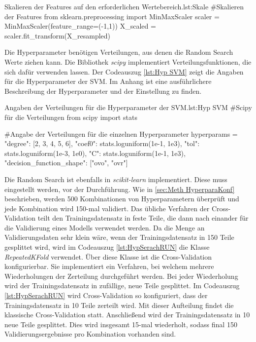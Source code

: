 \begin{pythoncode}{Skalieren der Features auf den erforderlichen Wertebereich.}{lst:Skale}
#Skalieren der Features 
from sklearn.preprocessing import MinMaxScaler
scaler = MinMaxScaler(feature_range=(-1,1))
X_scaled = scaler.fit_transform(X_resampled)
\end{pythoncode}

Die Hyperparameter benötigen Verteilungen, aus denen die Random Search Werte ziehen kann. Die Bibliothek \textit{scipy} implementiert Verteilungsfunktionen, die sich dafür verwenden lassen. Der Codeauszug \ref{lst:Hyp SVM} zeigt die Angaben für die Hyperparameter der SVM. Im Anhang ist eine ausführlichere Beschreibung der Hyperparameter und der Einstellung zu finden.

\begin{pythoncode}{Angaben der Verteilungen für die Hyperparameter der SVM.}{lst:Hyp SVM}
#Scipy für die Verteilungen
from scipy import stats

#Angabe der Verteilungen für die einzelnen Hyperparameter
hyperparams =  {"degree": [2, 3, 4, 5, 6],
                "coef0": stats.loguniform(1e-1, 1e3),
                "tol": stats.loguniform(1e-3, 1e0),
                "C": stats.loguniform(1e-1, 1e3),
                "decision_function_shape": ["ovo", "ovr"]}
\end{pythoncode}

Die Random Search ist ebenfalls in \textit{scikit-learn} implementiert. Diese muss eingestellt werden, vor der Durchführung. Wie in \autoref{sec:Meth HyperparaKonf} beschrieben, werden 500 Kombinationen von Hyperparametern überprüft und jede Kombination wird 150-mal validiert. Das übliche Verfahren der Cross-Validation teilt den Trainingsdatensatz in feste Teile, die dann nach einander für die Validierung eines Modells verwendet werden. Da die Menge an Validierungsdaten sehr klein wäre, wenn der Trainingsdatensatz in 150 Teile gesplittet wird, wird im Codeauszug \ref{lst:HypSerachRUN} die Klasse \textit{RepeatedKFold} verwendet. Über diese Klasse ist die Cross-Validation konfigurierbar. Sie implementiert ein Verfahren, bei welchem mehrere Wiederholungen der Zerteilung durchgeführt werden. Bei jeder Wiederholung wird der Trainingsdatensatz in zufällige, neue Teile gesplittet. Im Codeauszug \ref{lst:HypSerachRUN} wird Cross-Validation so konfiguriert, dass der Trainingsdatensatz in 10 Teile zerteilt wird. Mit dieser Aufteilung findet die klassische Cross-Validation statt. Anschließend wird der Trainingsdatensatz in 10 neue Teile gesplittet. Dies wird insgesamt 15-mal wiederholt, sodass final 150 Validierungsergebnisse pro Kombination vorhanden sind. \par

